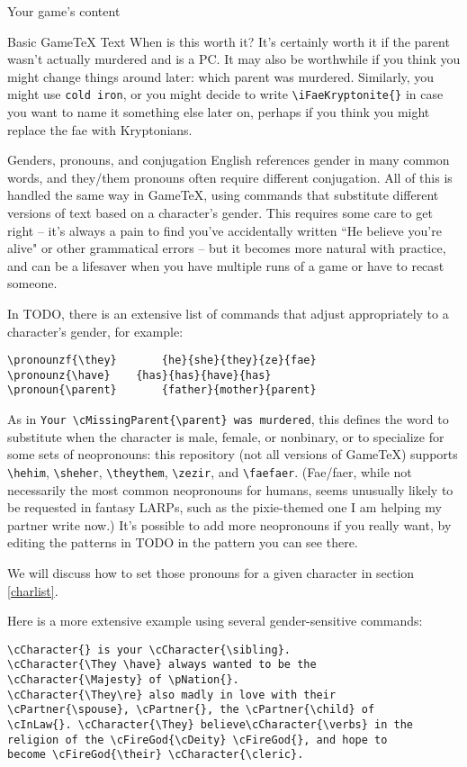 \documentclass{article}
\newcommand{\gametex}{GameTeX}
\newcommand{\pronounfile}{TODO}
\begin{document}
\begin{section}{Your game's content}
\begin{subsection}{Basic \gametex{} Text}
When is this worth it?  It's certainly worth it if the parent wasn't actually murdered and is a PC.  It may also be worthwhile if you think you might change things around later: which parent was murdered.  Similarly, you might use \lstinline|cold iron|, or you might decide to write \lstinline|\iFaeKryptonite{}| in case you want to name it something else later on, perhaps if you think you might replace the fae with Kryptonians.
\end{subsection}
\begin{subsection}{Genders, pronouns, and conjugation}
English references gender in many common words, and they/them pronouns often require different conjugation.  All of this is handled the same way in \gametex{}, using commands that substitute different versions of text based on a character's gender.  This requires some care to get right – it's always a pain to find you've accidentally written ``He believe you're alive" or other grammatical errors – but it becomes more natural with practice, and can be a lifesaver when you have multiple runs of a game or have to recast someone.

In \pronounfile{}, there is an extensive list of commands that adjust appropriately to a character's gender, for example:
\begin{verbatim}
\pronounzf{\they}		{he}{she}{they}{ze}{fae}
\pronounz{\have}	{has}{has}{have}{has}
\pronoun{\parent}		{father}{mother}{parent}
\end{verbatim}

As in \lstinline|Your \cMissingParent{\parent} was murdered|, this defines the word to substitute when the character is male, female, or nonbinary, or to specialize for some sets of neopronouns: this repository (not all versions of \gametex{}) supports \lstinline{\hehim}, \lstinline{\sheher}, \lstinline{\theythem}, \lstinline{\zezir}, and \lstinline{\faefaer}.  (Fae/faer, while not necessarily the most common neopronouns for humans, seems unusually likely to be requested in fantasy LARPs, such as the pixie-themed one I am helping my partner write now.)  It's possible to add more neopronouns if you really want, by editing the patterns in \pronounfile{} in the pattern you can see there.

We will discuss how to set those pronouns for a given character in section \ref{charlist}.

Here is a more extensive example using several gender-sensitive commands:

\begin{verbatim}
\cCharacter{} is your \cCharacter{\sibling}.
\cCharacter{\They \have} always wanted to be the
\cCharacter{\Majesty} of \pNation{}.  
\cCharacter{\They\re} also madly in love with their 
\cPartner{\spouse}, \cPartner{}, the \cPartner{\child} of 
\cInLaw{}. \cCharacter{\They} believe\cCharacter{\verbs} in the 
religion of the \cFireGod{\cDeity} \cFireGod{}, and hope to 
become \cFireGod{\their} \cCharacter{\cleric}.
\end{verbatim}


\end{subsection}
\end{section}
\end{document}
